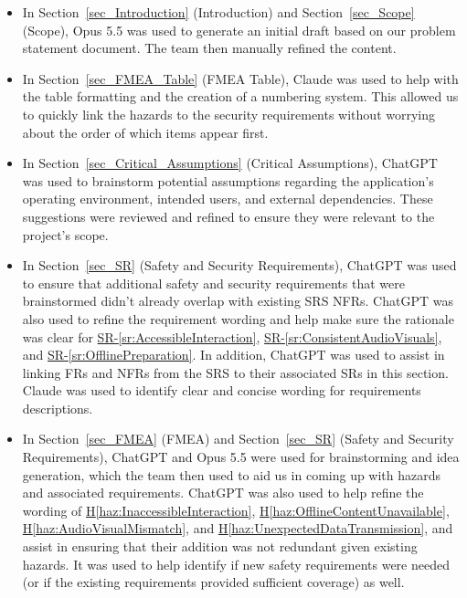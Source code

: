 \documentclass{article}
\newcounter{hazard}
\newcommand{\hazref}[1]{\hyperref[haz:#1]{H\ref*{haz:#1}}}
\newcounter{sr}
\newcommand{\srref}[1]{\hyperref[sr:#1]{SR-\ref*{sr:#1}}}
\begin{document}
\begin{itemize}
  \item In Section~\ref{sec_Introduction} (Introduction) and Section~\ref{sec_Scope} (Scope),
  Opus 5.5 was used to generate an initial draft based on our problem statement document.
  The team then manually refined the content.

  \item In Section~\ref{sec_FMEA_Table} (FMEA Table), Claude was used to help with the table formatting
  and the creation of a numbering system. This allowed us to quickly link the
  hazards to the security requirements without worrying about the order of
  which items appear first.
  
  \item In Section~\ref{sec_Critical_Assumptions} (Critical Assumptions),
  ChatGPT was used to brainstorm potential assumptions regarding
  the application's operating environment, intended users, and
  external dependencies. These suggestions were reviewed and
  refined to ensure they were relevant to the project's scope.

  \item In Section~\ref{sec_SR} (Safety and Security Requirements),
  ChatGPT was used to ensure that additional safety and security
  requirements that were brainstormed didn't already overlap with existing SRS 
  NFRs. ChatGPT was also used to refine the requirement wording and help make sure the rationale was clear for 
  \srref{AccessibleInteraction}, \srref{ConsistentAudioVisuals}, and \srref{OfflinePreparation}. In addition, ChatGPT 
  was used to assist in linking FRs and NFRs from the SRS to their associated SRs in this section. Claude was used to
  identify clear and concise wording for requirements descriptions.

  \item In Section~\ref{sec_FMEA} (FMEA) and Section~\ref{sec_SR} (Safety and Security Requirements),
  ChatGPT and Opus 5.5 were used for brainstorming and idea generation, which the team
  then used to aid us in coming up with hazards and associated requirements. ChatGPT was also used to help refine the wording of \hazref{InaccessibleInteraction}, \hazref{OfflineContentUnavailable},
  \hazref{AudioVisualMismatch}, and \hazref{UnexpectedDataTransmission}, and assist in ensuring that their addition was not redundant given existing hazards. It was used 
  to help identify if new safety requirements were needed (or if the existing requirements provided sufficient coverage) as well.


\end{itemize}
\end{document}
